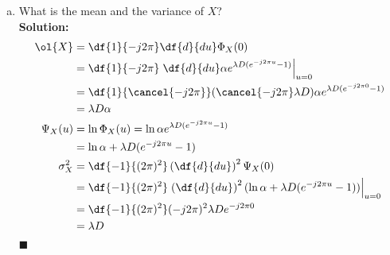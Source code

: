 \begin{enumerate}[(a)]
\item What is the mean and the variance of $X$? \\
  \textbf{Solution:}\\
  \begin{align*}
    \ol{X}    & = \df{1}{-j2\pi} \df{d}{du} \Phi_X(0)\\
              & = \df{1}{-j2\pi} \left. \df{d}{du} \alpha e^{\lambda D (e^{-j2\pi u} - 1)} \right|_{u=0}\\
              & = \df{1}{\cancel{-j2\pi}} (\cancel{-j2\pi}\lambda D ) \alpha e^{\lambda D (e^{-j2\pi 0} - 1)}\\
              & = \lambda D \alpha \\
    \Psi_X(u) & = \ln \Phi_X(u) = \ln \alpha e^{\lambda D (e^{-j2\pi u} - 1)} \\
              & = \ln \alpha + \lambda D (e^{-j2\pi u} - 1) \\
    \sigma_X^2 & = \df{-1}{(2\pi)^2} \left( \df{d}{du} \right)^2 \Psi_X(0) \\
              & = \df{-1}{(2\pi)^2} \left. \left( \df{d}{du} \right)^2
                                                  (\ln \alpha + \lambda D (e^{-j2\pi u} - 1)) \right|_{u=0} \\
              & = \df{-1}{(2\pi)^2} (-j2\pi)^2 \lambda D e^{-j 2\pi 0} \\
              & = \lambda D
  \end{align*}
  \hfill $\blacksquare$
\end{enumerate}
\vspace{.5in}